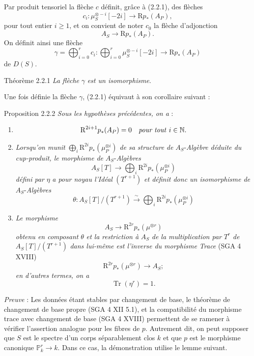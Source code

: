 Par
produit tensoriel la flèche $c$ définit, grâce à (2.2.1), des flèches
\[
c_i:\mu_S^{\otimes -i}[-2i]\longrightarrow \mathrm{R} p_*(A_P),
\]
pour tout entier $i\ge1$, et on convient de noter $c_0$ la flèche d'adjonction
\[
A_S\longrightarrow \mathrm{R} p_*(A_P).
\]
On définit ainsi une flèche
\[
\gamma=\bigoplus_{i=0}^{r}c_i:
\bigoplus_{i=0}^{r}\mu_S^{\otimes -i}[-2i]\longrightarrow \mathrm{R} p_*(A_P)
\]
de $D(S)$.

\begin{statement}{Théorème 2.2.1}
\emph{La flèche} $\gamma$ \emph{est un isomorphisme}.
\end{statement}

Une fois définie la flèche $\gamma$, (2.2.1) équivaut à son corollaire suivant :

\begin{statement}{Proposition 2.2.2}
\emph{Sous les hypothèses précédentes, on a} :
\begin{enumerate}[label=\alph*)]
\item
\[
\mathrm{R}^{2i+1}p_*(A_P)=0\quad\text{\emph{pour tout} }i\in\mathbb{N}.
\]
\item \emph{Lorsqu'on munit} $\bigoplus_i \mathrm{R}^{2i}p_*(\mu_P^{\otimes i})$ \emph{de sa structure de} $A_S$-\emph{Algèbre déduite du cup-produit, le morphisme de} $A_S$-\emph{Algèbres}
\[
A_S[T]\longrightarrow \bigoplus_i \mathrm{R}^{2i}p_*(\mu_P^{\otimes i})
\]
\emph{défini par} $\eta$ \emph{a pour noyau l'Idéal} $(T^{r+1})$ \emph{et définit donc un isomorphisme de} $A_S$-\emph{Algèbres}
\[
\theta:A_S[T]/(T^{r+1})\xrightarrow{\sim}\bigoplus_i \mathrm{R}^{2i}p_*(\mu_P^{\otimes i})
\]
\item \emph{Le morphisme}
\[
A_S\longrightarrow \mathrm{R}^{2r}p_*(\mu^{\otimes r})
\]
\emph{obtenu en composant} $\theta$ \emph{et la restriction à} $A_S$ \emph{de la multiplication par} $T^r$ \emph{de} $A_S[T]/(T^{r+1})$ \emph{dans lui-même est l'inverse du morphisme Trace} (SGA 4 XVIII)
\[
\mathrm{R}^{2r}p_*(\mu^{\otimes r})\longrightarrow A_S;
\]
\emph{en d'autres termes, on a}
\[
\operatorname{Tr}(\eta^r)=1.
\]
\end{enumerate}
\end{statement}

\emph{Preuve} : Les données étant stables par changement de base, le théorème de changement de base propre (SGA 4 XII 5.1), et la compatibilité du morphisme trace avec changement de base (SGA 4 XVIII) permettent de se ramener à vérifier l'assertion analogue pour les fibres de $p$. Autrement dit, on peut supposer que $S$ est le spectre d'un corps séparablement clos $k$ et que $p$ est le morphisme canonique $\mathbb{P}^r_k\to k$. Dans ce cas, la démonstration utilise le lemme suivant.

